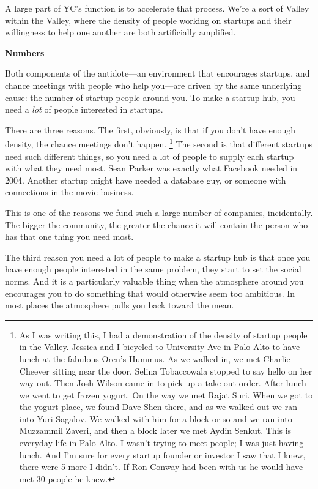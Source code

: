 \documentclass[12pt]{book}
\begin{document}
A large part of YC's function is to accelerate that process. We're a
sort of Valley within the Valley, where the density of people working on
startups and their willingness to help one another are both artificially
amplified.

\textbf{Numbers}

Both components of the antidote---an environment that encourages
startups, and chance meetings with people who help you---are driven by
the same underlying cause: the number of startup people around you. To
make a startup hub, you need a \emph{lot} of people interested in
startups.

There are three reasons. The first, obviously, is that if you don't have
enough density, the chance meetings don't happen.
\footnote{As I was writing this, I had a demonstration of the density of
startup people in the Valley. Jessica and I bicycled to University Ave
in Palo Alto to have lunch at the fabulous Oren's Hummus. As we walked
in, we met Charlie Cheever sitting near the door. Selina Tobaccowala
stopped to say hello on her way out. Then Josh Wilson came in to pick up
a take out order. After lunch we went to get frozen yogurt. On the way
we met Rajat Suri. When we got to the yogurt place, we found Dave Shen
there, and as we walked out we ran into Yuri Sagalov. We walked with him
for a block or so and we ran into Muzzammil Zaveri, and then a block
later we met Aydin Senkut. This is everyday life in Palo Alto. I wasn't
trying to meet people; I was just having lunch. And I'm sure for every
startup founder or investor I saw that I knew, there were 5 more I
didn't. If Ron Conway had been with us he would have met 30 people he
knew.} The second is that different startups need such
different things, so you need a lot of people to supply each startup
with what they need most. Sean Parker was exactly what Facebook needed
in 2004. Another startup might have needed a database guy, or someone
with connections in the movie business.

This is one of the reasons we fund such a large number of companies,
incidentally. The bigger the community, the greater the chance it will
contain the person who has that one thing you need most.

The third reason you need a lot of people to make a startup hub is that
once you have enough people interested in the same problem, they start
to set the social norms. And it is a particularly valuable thing when
the atmosphere around you encourages you to do something that would
otherwise seem too ambitious. In most places the atmosphere pulls you
back toward the mean.
\end{document}
